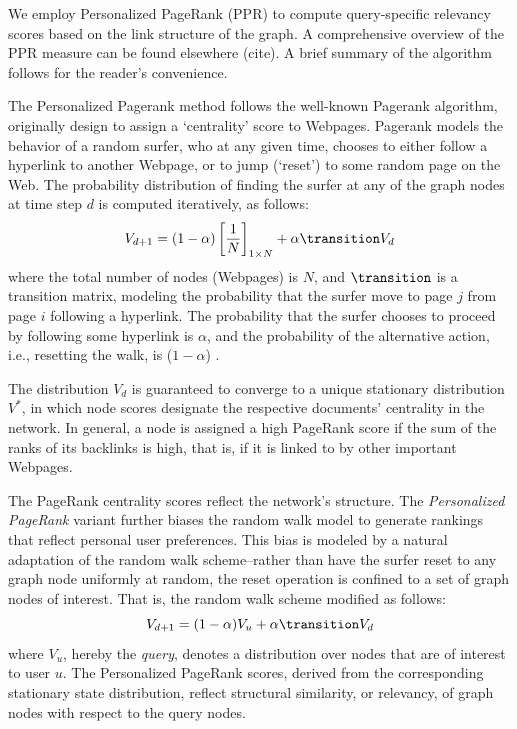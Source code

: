\documentclass[ijoc,nonblindrev]{informs3} %
\numberwithin{equation}{subsection}
\begin{document}
We employ Personalized PageRank (PPR) \citep{page1999pagerank} to compute query-specific relevancy scores based on the link structure of the graph. A comprehensive overview of the PPR measure can be found elsewhere (cite). A brief summary of the algorithm follows for the reader's convenience.

The Personalized Pagerank method follows the well-known Pagerank algorithm, originally design to assign a `centrality' score to Webpages. Pagerank models the behavior of a random surfer, who at any given time, chooses to either follow a hyperlink to another Webpage, or to jump (`reset') to some random page on the Web. The probability distribution of finding the surfer at any of the graph nodes at time step $d$ is computed iteratively, as follows:
\begin{equation}
V_{d+1} = (1-\alpha) \left[{1 \over N}\right]_{1 \times N} + \alpha \transition V_d
\label{eq:pagerank}
\end{equation}
where the total number of nodes (Webpages) is $N$, and $\transition$
is a transition matrix, modeling the probability that the surfer move
to page $j$ from page $i$ following a hyperlink. The probability that
the surfer chooses to proceed by following some hyperlink is $\alpha$, and the probability of the alternative action, i.e., resetting the walk, is ($1-\alpha$) .

The distribution $V_d$ is guaranteed to converge to a unique stationary distribution $V^*$, in which node scores designate the respective documents' centrality in the network. In general, a node is assigned a high PageRank score if the sum of the ranks of its backlinks is high, that is, if it is linked to by other important Webpages.

The PageRank centrality scores reflect the network's structure. The {\it Personalized PageRank} variant further biases the random walk model to
generate rankings that reflect personal user preferences. This bias is modeled by a natural adaptation of the random walk scheme--rather than have the surfer reset to any graph node uniformly at random, the reset operation is confined to a set of graph nodes of interest. That is, the random walk scheme modified as follows:
\begin{equation}
V_{d+1} = (1-\alpha) V_u + \alpha \transition V_d
\label{eq:ppr}
\end{equation}
where $V_u$, hereby the {\it query}, denotes a distribution over nodes that are of interest to user $u$. The Personalized PageRank scores, derived from the corresponding stationary state distribution, reflect structural similarity, or relevancy, of graph nodes with respect to the query nodes.
\end{document}
